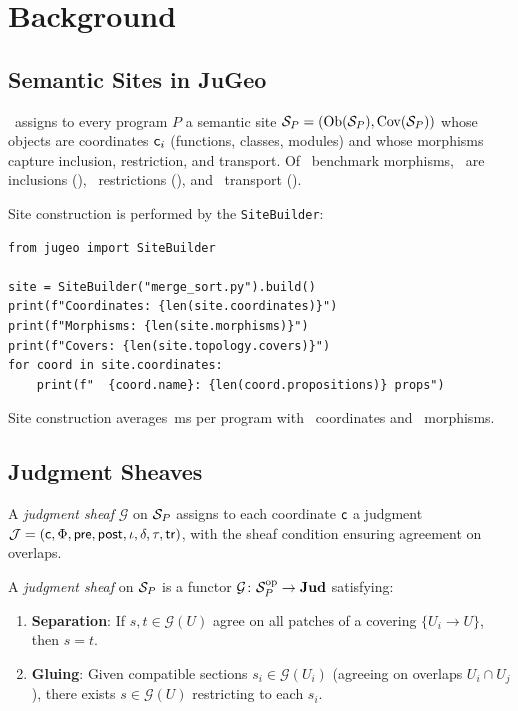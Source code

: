 \documentclass[11pt]{article}
\newcommand{\props}{\Phi}
\newcommand{\precond}{\mathsf{pre}}
\newcommand{\postcond}{\mathsf{post}}
\newcommand{\inv}{\iota}
\newcommand{\tr}{\mathsf{tr}}
\begin{document}
\section{Background}\label{sec:background}

\subsection{Semantic Sites in JuGeo}
\JuGeo\ assigns to every program $P$ a semantic site
$\mathcal{S}_P = (\mathrm{Ob}(\mathcal{S}_P), \mathrm{Cov}(\mathcal{S}_P))$ whose objects are
coordinates $\mathsf{c}_i$ (functions, classes, modules) and whose
morphisms capture inclusion, restriction, and transport.  Of
\compMorphTotal\ benchmark morphisms, \compMorphInclusion\ are
inclusions (\compMorphInclusionPct), \compMorphRestriction\ restrictions
(\compMorphRestrictionPct), and \compMorphTransport\ transport
(\compMorphTransportPct).

Site construction is performed by the \texttt{SiteBuilder}:

\begin{lstlisting}[style=jugeo-python]
from jugeo import SiteBuilder

site = SiteBuilder("merge_sort.py").build()
print(f"Coordinates: {len(site.coordinates)}")
print(f"Morphisms: {len(site.morphisms)}")
print(f"Covers: {len(site.topology.covers)}")
for coord in site.coordinates:
    print(f"  {coord.name}: {len(coord.propositions)} props")
\end{lstlisting}

Site construction averages \compSiteMeanBuildMs\,ms per program with
\compSiteMeanCoords\ coordinates and \compSiteMeanMorphisms\ morphisms.

\subsection{Judgment Sheaves}
A \emph{judgment sheaf} $\mathcal{G}$ on $\mathcal{S}_P$ assigns to each
coordinate $\mathsf{c}$ a judgment
$\J = (\coord, \props, \precond, \postcond, \inv, \delta, \tau, \tr)$,
with the sheaf condition ensuring agreement on overlaps.

\begin{definition}\label{def:judgment-sheaf}
A \emph{judgment sheaf} on $\mathcal{S}_P$ is a functor
$\mathcal{G} \colon \mathcal{S}_P^{\mathrm{op}} \to \mathbf{Jud}$ satisfying:
\begin{enumerate}[noitemsep]
  \item \textbf{Separation}: If $s, t \in \mathcal{G}(U)$ agree on
        all patches of a covering $\{U_i \to U\}$, then $s = t$.
  \item \textbf{Gluing}: Given compatible sections
        $s_i \in \mathcal{G}(U_i)$ (agreeing on overlaps
        $U_i \cap U_j$), there exists $s \in \mathcal{G}(U)$
        restricting to each $s_i$.
\end{enumerate}
\end{definition}
\end{document}
